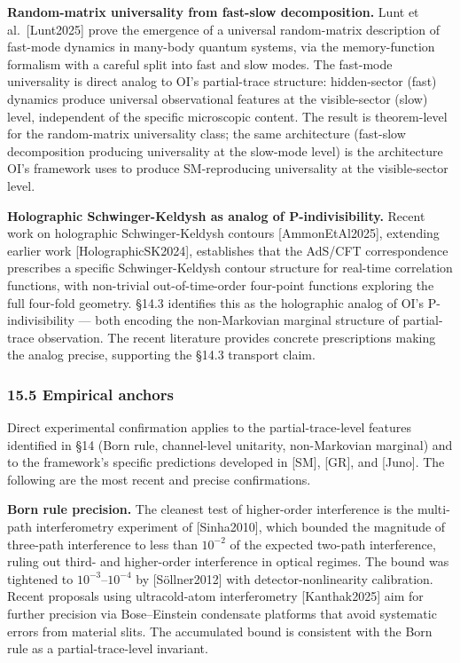 \documentclass[
]{article}
\begin{document}
\textbf{Random-matrix universality from fast-slow decomposition.} Lunt
et al.~{[}Lunt2025{]} prove the emergence of a universal random-matrix
description of fast-mode dynamics in many-body quantum systems, via the
memory-function formalism with a careful split into fast and slow modes.
The fast-mode universality is direct analog to OI's partial-trace
structure: hidden-sector (fast) dynamics produce universal observational
features at the visible-sector (slow) level, independent of the specific
microscopic content. The result is theorem-level for the random-matrix
universality class; the same architecture (fast-slow decomposition
producing universality at the slow-mode level) is the architecture OI's
framework uses to produce SM-reproducing universality at the
visible-sector level.

\textbf{Holographic Schwinger-Keldysh as analog of P-indivisibility.}
Recent work on holographic Schwinger-Keldysh contours
{[}AmmonEtAl2025{]}, extending earlier work {[}HolographicSK2024{]},
establishes that the AdS/CFT correspondence prescribes a specific
Schwinger-Keldysh contour structure for real-time correlation functions,
with non-trivial out-of-time-order four-point functions exploring the
full four-fold geometry. §14.3 identifies this as the holographic analog
of OI's P-indivisibility --- both encoding the non-Markovian marginal
structure of partial-trace observation. The recent literature provides
concrete prescriptions making the analog precise, supporting the §14.3
transport claim.

\hypertarget{empirical-anchors}{%
\subsubsection{15.5 Empirical anchors}\label{empirical-anchors}}

Direct experimental confirmation applies to the partial-trace-level
features identified in §14 (Born rule, channel-level unitarity,
non-Markovian marginal) and to the framework's specific predictions
developed in {[}SM{]}, {[}GR{]}, and {[}Juno{]}. The following are the
most recent and precise confirmations.

\textbf{Born rule precision.} The cleanest test of higher-order
interference is the multi-path interferometry experiment of
{[}Sinha2010{]}, which bounded the magnitude of three-path interference
to less than \(10^{-2}\) of the expected two-path interference, ruling
out third- and higher-order interference in optical regimes. The bound
was tightened to \(10^{-3}\)--\(10^{-4}\) by {[}Söllner2012{]} with
detector-nonlinearity calibration. Recent proposals using ultracold-atom
interferometry {[}Kanthak2025{]} aim for further precision via
Bose--Einstein condensate platforms that avoid systematic errors from
material slits. The accumulated bound is consistent with the Born rule
as a partial-trace-level invariant.
\end{document}
